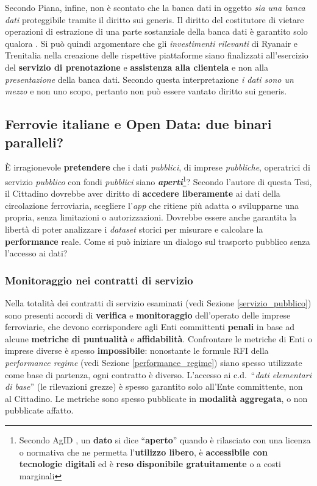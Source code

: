 \documentclass[12pt,italian]{report}
\begin{document}
Secondo Piana, infine, non è scontato che la banca dati in oggetto
\textit{sia una banca dati} proteggibile tramite il diritto sui
generis.  Il diritto del costitutore di vietare operazioni di
estrazione di una parte sostanziale della banca dati è garantito solo
qualora .  Si può quindi argomentare che gli
\textit{investimenti rilevanti} di Ryanair e Trenitalia nella
creazione delle rispettive piattaforme siano finalizzati all'esercizio
del \textbf{servizio di prenotazione} e \textbf{assistenza alla
    clientela} e non alla \textit{presentazione} della banca dati.
Secondo questa interpretazione \textit{i dati sono un mezzo} e non uno
scopo, pertanto non può essere vantato diritto sui generis.

\subsection{Ferrovie italiane e Open Data: due binari paralleli?}

È irragionevole \textbf{pretendere} che i dati \textit{pubblici}, di
imprese \textit{pubbliche}, operatrici di servizio \textit{pubblico}
con fondi \textit{pubblici} siano
\textbf{\textit{aperti}}\footnote{Secondo AgID \cite{AgidOpenData}, un
    \textbf{dato} si dice ``\textbf{aperto}'' quando è rilasciato con
    una licenza o normativa che ne permetta l'\textbf{utilizzo
        libero}, è \textbf{accessibile con tecnologie digitali} ed è
    \textbf{reso disponibile gratuitamente} o a costi marginali}?
Secondo l'autore di questa Tesi, il Cittadino dovrebbe aver diritto di
\textbf{accedere liberamente} ai dati della circolazione ferroviaria,
scegliere l'\textit{app} che ritiene più adatta o svilupparne una
propria, senza limitazioni o autorizzazioni.  Dovrebbe essere anche
garantita la libertà di poter analizzare i \textit{dataset} storici
per misurare e calcolare la \textbf{performance} reale.  Come si può
iniziare un dialogo sul trasporto pubblico senza l'accesso ai dati?

\subsubsection{Monitoraggio nei contratti di servizio}

Nella totalità dei contratti di servizio esaminati (vedi Sezione
\ref{servizio_pubblico}) sono presenti accordi di \textbf{verifica} e
\textbf{monitoraggio} dell'operato delle imprese ferroviarie, che
devono corrispondere agli Enti committenti \textbf{penali} in base ad
alcune \textbf{metriche di puntualità} e \textbf{affidabilità}.
Confrontare le metriche di Enti o imprese diverse è spesso
\textbf{impossibile}: nonostante le formule RFI della
\textit{performance regime} (vedi Sezione \ref{performance_regime})
siano spesso utilizzate come base di partenza, ogni contratto è
diverso.  L'accesso ai c.d.\ ``\textit{dati elementari di base}'' (le
rilevazioni grezze) è spesso garantito solo all'Ente committente, non
al Cittadino.  Le metriche sono spesso pubblicate in \textbf{modalità
    aggregata}, o non pubblicate affatto.
\end{document}
